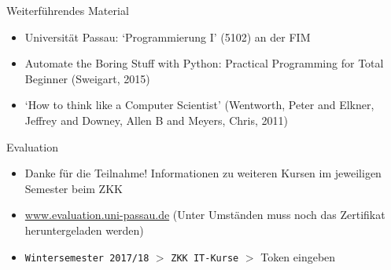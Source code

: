 \begin{frame}{Weiterführendes Material}
\begin{itemize}
    \item Universität Passau: `Programmierung I' (5102) an der FIM
    \item Automate the Boring Stuff with Python: Practical Programming for Total Beginner (Sweigart, 2015)
    \item `How to think like a Computer Scientist' (Wentworth, Peter and Elkner, Jeffrey and Downey, Allen B and Meyers, Chris, 2011) 
\end{itemize}
\end{frame}

\begin{frame}{Evaluation}
\begin{itemize}
    \item Danke für die Teilnahme! Informationen zu weiteren Kursen im jeweiligen Semester beim ZKK
    \item \url{www.evaluation.uni-passau.de} (Unter Umständen muss noch das Zertifikat
        heruntergeladen werden)
    \item \texttt{Wintersemester 2017/18} $>$ \texttt{ZKK IT-Kurse} $>$ Token eingeben 
\end{itemize}
\end{frame}

